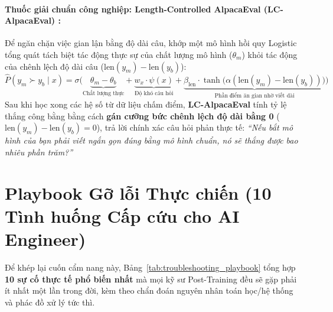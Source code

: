 \paragraph{Thuốc giải chuẩn công nghiệp: Length-Controlled AlpacaEval (LC-AlpacaEval) \citep{dubois2024length}:}
Để ngăn chặn việc gian lận bằng độ dài câu, \citet{dubois2024length} khớp một mô hình hồi quy Logistic tổng quát tách biệt tác động thực sự của chất lượng mô hình ($\theta_m$) khỏi tác động của chênh lệch độ dài câu ($\text{len}(y_m) - \text{len}(y_b)$):
\begin{equation}
  \hat{P}(y_m \succ y_b \mid x) = \sigma\Big( \underbrace{\theta_m - \theta_b}_{\text{Chất lượng thực}} + \underbrace{w_x \cdot \psi(x)}_{\text{Độ khó câu hỏi}} + \underbrace{\beta_{\text{len}} \cdot \tanh\big(\alpha (\text{len}(y_m) - \text{len}(y_b))\big)}_{\text{Phần điểm ăn gian nhờ viết dài}} \Big)
  \label{eq:lc_alpacaeval}
\end{equation}
Sau khi học xong các hệ số từ dữ liệu chấm điểm, \textbf{LC-AlpacaEval} tính tỷ lệ thắng công bằng bằng cách \textbf{gán cưỡng bức chênh lệch độ dài bằng 0} ($\text{len}(y_m) - \text{len}(y_b) = 0$), trả lời chính xác câu hỏi phản thực tế: \textit{``Nếu bắt mô hình của bạn phải viết ngắn gọn đúng bằng mô hình chuẩn, nó sẽ thắng được bao nhiêu phần trăm?''}

\section{Playbook Gỡ lỗi Thực chiến (10 Tình huống Cấp cứu cho AI Engineer)}
\label{sec:debugging_playbook}

Để khép lại cuốn cẩm nang này, Bảng~\ref{tab:troubleshooting_playbook} tổng hợp \textbf{10 sự cố thực tế phổ biến nhất} mà mọi kỹ sư Post-Training đều sẽ gặp phải ít nhất một lần trong đời, kèm theo chẩn đoán nguyên nhân toán học/hệ thống và phác đồ xử lý tức thì.

